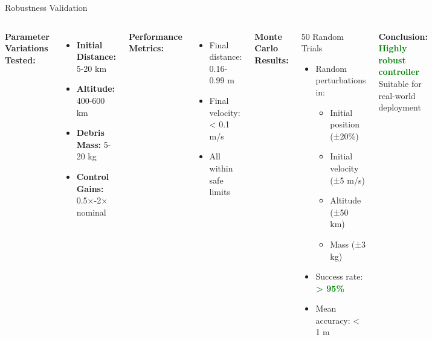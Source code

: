 \documentclass[aspectratio=169]{beamer}
\begin{document}
\begin{frame}{Robustness Validation}
\begin{columns}
\textbf{Parameter Variations Tested:}
\begin{itemize}
    \item \textbf{Initial Distance:} 5-20 km
    \item \textbf{Altitude:} 400-600 km
    \item \textbf{Debris Mass:} 5-20 kg
    \item \textbf{Control Gains:} 0.5×-2× nominal
\end{itemize}

\vspace{1em}
\textbf{Performance Metrics:}
\begin{itemize}
    \item Final distance: 0.16-0.99 m
    \item Final velocity: < 0.1 m/s
    \item All within safe limits
\end{itemize}

\textbf{Monte Carlo Results:}
\begin{block}{50 Random Trials}
\begin{itemize}
    \item Random perturbations in:
    \begin{itemize}
        \item Initial position (±20\%)
        \item Initial velocity (±5 m/s)
        \item Altitude (±50 km)
        \item Mass (±3 kg)
    \end{itemize}
    \item Success rate: \textcolor{green}{\textbf{> 95\%}}
    \item Mean accuracy: < 1 m
\end{itemize}
\end{block}

\vspace{0.5em}
\textbf{Conclusion:}\\
\textcolor{green}{\textbf{Highly robust controller}}\\
Suitable for real-world deployment
\end{columns}
\end{frame}
\end{document}
